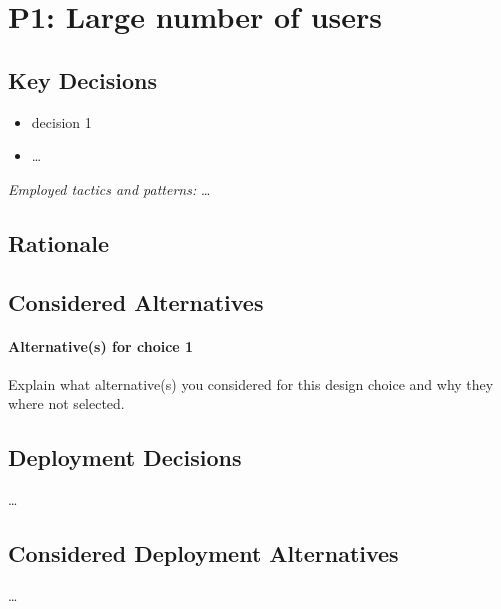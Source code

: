 \section{P1: Large number of users}


    \subsection*{Key Decisions}


        \begin{itemize}
        	\item decision 1
        	\item \ldots
        \end{itemize}
        \emph{Employed tactics and patterns:} \ldots

    \subsection*{Rationale}

    \subsection*{Considered Alternatives}
        \paragraph{Alternative(s) for choice 1} Explain what alternative(s) you
        considered for this design choice and why they where not selected.

    \subsection*{Deployment Decisions}
        \ldots

    \subsection*{Considered Deployment Alternatives}
        \ldots
